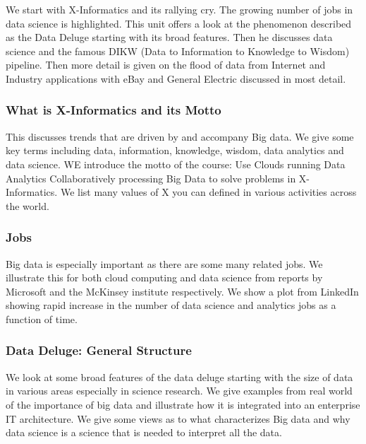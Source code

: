 We start with X-Informatics and its rallying cry. The growing number of
jobs in data science is highlighted. This unit offers a look at the
phenomenon described as the Data Deluge starting with its broad
features. Then he discusses data science and the famous DIKW (Data to
Information to Knowledge to Wisdom) pipeline. Then more detail is given
on the flood of data from Internet and Industry applications with eBay
and General Electric discussed in most detail.




\subsubsection{What is X-Informatics and its
Motto}\label{what-is-x-informatics-and-its-motto}

This discusses trends that are driven by and accompany Big data. We give
some key terms including data, information, knowledge, wisdom, data
analytics and data science. WE introduce the motto of the course: Use
Clouds running Data Analytics Collaboratively processing Big Data to
solve problems in X-Informatics. We list many values of X you can
defined in various activities across the world.






\subsubsection{Jobs}\label{jobs}

Big data is especially important as there are some many related jobs. We
illustrate this for both cloud computing and data science from reports
by Microsoft and the McKinsey institute respectively. We show a plot
from LinkedIn showing rapid increase in the number of data science and
analytics jobs as a function of time.



\subsubsection{Data Deluge: General
Structure}\label{data-deluge-general-structure}

We look at some broad features of the data deluge starting with the size
of data in various areas especially in science research. We give
examples from real world of the importance of big data and illustrate
how it is integrated into an enterprise IT architecture. We give some
views as to what characterizes Big data and why data science is a
science that is needed to interpret all the data.


